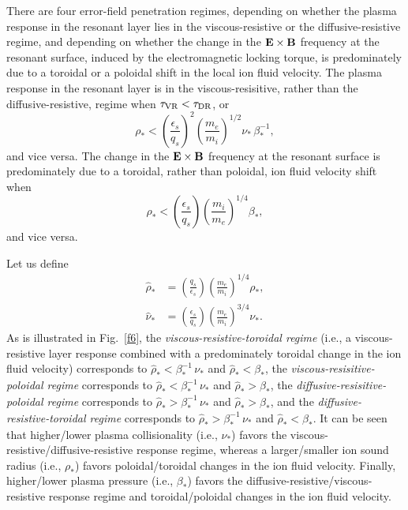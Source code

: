 \documentclass[12pt,prb,aps]{revtex4-1}
\begin{document}
There are four error-field penetration regimes, depending on whether the plasma response in the resonant layer lies 
in the viscous-resistive or the diffusive-resistive regime, and depending on whether the change in the ${\bf E}\times{\bf B}$
frequency at the resonant surface, induced by the electromagnetic locking torque,  is
predominately due to a toroidal or a poloidal shift in the local ion fluid velocity. The plasma response in the resonant layer is in the
viscous-resisitive, rather than the diffusive-resistive, regime when $\tau_{\rm VR}<\tau_{\rm DR}$, or
\begin{equation}
\rho_\ast < \left(\frac{\epsilon_s}{q_s}\right)^2\left(\frac{m_e}{m_i}\right)^{1/2}\nu_\ast\,\beta_\ast^{-1},
\end{equation}
and vice versa. The change in the ${\bf E}\times{\bf B}$ frequency at the resonant surface is predominately due to a toroidal, rather than poloidal, ion fluid velocity shift when
\begin{equation}
\rho_\ast < \left(\frac{\epsilon_s}{q_s}\right)\left(\frac{m_i}{m_e}\right)^{1/4}\beta_\ast,
\end{equation}
and vice versa. 

Let us define 
\begin{align}
\hat{\rho}_\ast&= \left(\frac{q_s}{\epsilon_s}\right)\left(\frac{m_e}{m_i}\right)^{1/4}\rho_\ast,\\[0.5ex]
\hat{\nu}_\ast&=\left(\frac{\epsilon_s}{q_s}\right)\left(\frac{m_e}{m_i}\right)^{3/4}\nu_\ast.
\end{align}
As is illustrated in Fig.~\ref{f6}, the {\em viscous-resistive-toroidal regime}\/ (i.e., a viscous-resistive layer response
combined with a predominately toroidal change in the ion fluid velocity) corresponds to $\hat{\rho}_\ast < \beta_\ast^{-1}\,\nu_\ast$ 
and $\hat{\rho}_\ast <\beta_\ast$, the {\em viscous-resisitive-poloidal regime}\/ corresponds to 
 $\hat{\rho}_\ast<\beta_\ast^{-1}\,\nu_\ast$ and $\hat{\rho}_\ast > \beta_\ast$, the {\em diffusive-resisitive-poloidal regime}\/ corresponds to  
 $\hat{\rho}_\ast>\beta_\ast^{-1}\,\nu_\ast$ and $\hat{\rho}_\ast > \beta_\ast$, and the {\em diffusive-resistive-toroidal regime}\/ corresponds to   
 $\hat{\rho}_\ast>\beta_\ast^{-1}\,\nu_\ast$ and $\hat{\rho}_\ast < \beta_\ast$.
It can be seen that higher/lower plasma collisionality (i.e., $\nu_\ast$) favors the viscous-resistive/diffusive-resistive response regime, whereas a
larger/smaller ion sound radius (i.e., $\rho_\ast$) favors poloidal/toroidal changes in the ion fluid velocity. Finally, higher/lower plasma
pressure (i.e., $\beta_\ast$) 
favors the diffusive-resistive/viscous-resistive response regime and toroidal/poloidal changes in the ion fluid velocity. 
\end{document}
